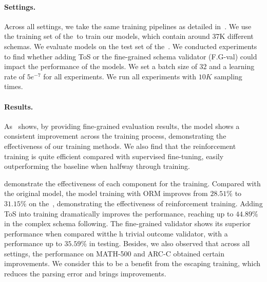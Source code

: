 \paragraph{Settings.} 
Across all settings, we take the same training pipelines as detailed in~. 
We use the training set of the~\ourbench to train our models, which contain around 37K different schemas.
We evaluate models on the test set of the~\ourbench.
We conducted experiments to find whether adding ToS or the fine-grained schema validator (F.G-val) could impact the performance of the models.
We set a batch size of $32$ and a learning rate of $5e^{-7}$ for all experiments.
We run all experiments with $10K$ sampling times.

\paragraph{Results.}
As~ shows, by providing fine-grained evaluation results, the model shows a consistent improvement across the training process, demonstrating the effectiveness of our training methods.
We also find that the reinforcement training is quite efficient compared with supervised fine-tuning, easily outperforming the baseline when halfway through training.


 demonstrate the effectiveness of each component for the training.
Compared with the original model, the model training with ORM improves from $28.51\%$ to $31.15\%$ on the~\ourbench, demonstrating the effectiveness of reinforcement training.
Adding ToS into training dramatically improves the performance, reaching up to $44.89\%$ in the complex schema following.
The fine-grained validator shows its superior performance when compared witthe h trivial outcome validator, with a performance up to $35.59\%$ in testing.
Besides, we also observed that across all settings, the performance on MATH-500 and ARC-C obtained certain improvements.
We consider this to be a benefit from the escaping training, which reduces the parsing error and brings improvements.
